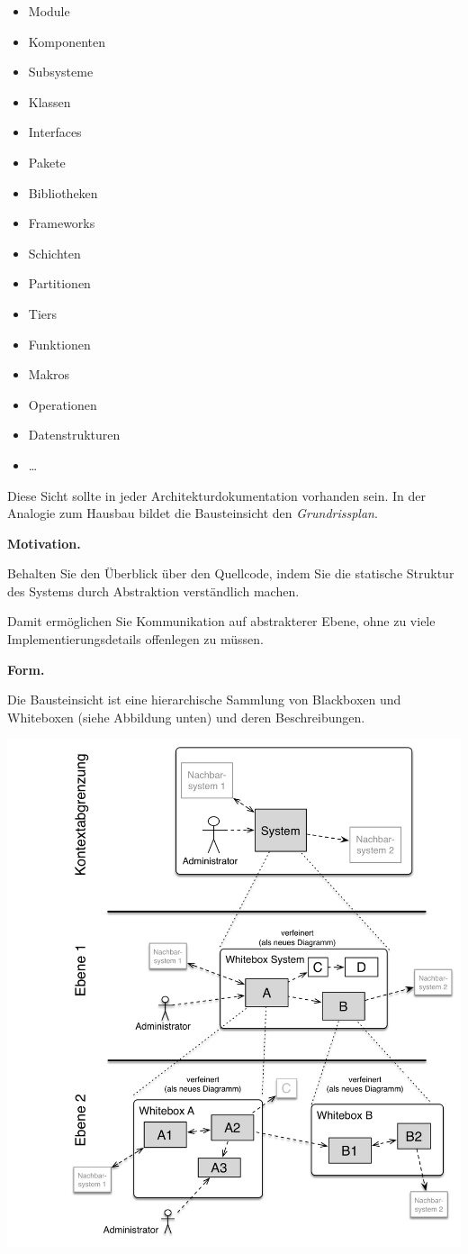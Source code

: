 \documentclass[]{article}
\begin{document}
\begin{itemize}
\item
  Module
\item
  Komponenten
\item
  Subsysteme
\item
  Klassen
\item
  Interfaces
\item
  Pakete
\item
  Bibliotheken
\item
  Frameworks
\item
  Schichten
\item
  Partitionen
\item
  Tiers
\item
  Funktionen
\item
  Makros
\item
  Operationen
\item
  Datenstrukturen
\item
  \ldots{}
\end{itemize}

Diese Sicht sollte in jeder Architekturdokumentation vorhanden sein. In
der Analogie zum Hausbau bildet die Bausteinsicht den
\emph{Grundrissplan}.

\textbf{Motivation.}

Behalten Sie den Überblick über den Quellcode, indem Sie die statische
Struktur des Systems durch Abstraktion verständlich machen.

Damit ermöglichen Sie Kommunikation auf abstrakterer Ebene, ohne zu
viele Implementierungsdetails offenlegen zu müssen.

\textbf{Form.}

Die Bausteinsicht ist eine hierarchische Sammlung von Blackboxen und
Whiteboxen (siehe Abbildung unten) und deren Beschreibungen.

\includegraphics{images/05_building_blocks-DE.png}
\end{document}
